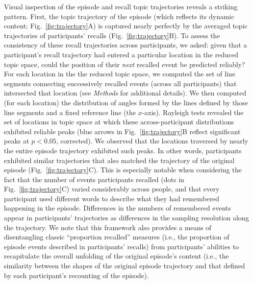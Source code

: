 \documentclass{article}
\begin{document}
Visual inspection of the episode and recall topic trajectories reveals a striking pattern.  First, the topic trajectory of the episode (which reflects its dynamic content; Fig.~\ref{fig:trajectory}A) is captured nearly perfectly by the averaged topic trajectories of participants' recalls (Fig.~\ref{fig:trajectory}B).  To assess the consistency of these recall trajectories across participants, we asked: given that a participant's recall trajectory had entered a particular location in the reduced topic space, could the position of their \textit{next} recalled event be predicted reliably?  For each location in the the reduced topic space, we computed the set of line segments connecting successively recalled events (across all participants) that intersected that location (see \textit{Methods} for additional details).  We then computed (for each location) the distribution of angles formed by the lines defined by those line segments and a fixed reference line (the $x$-axis).  Rayleigh tests revealed the set of locations in topic space at which these across-participant distributions exhibited reliable peaks (blue arrows in Fig.~\ref{fig:trajectory}B reflect significant peaks at $p < 0.05$, corrected).  We observed that the locations traversed by nearly the entire episode trajectory exhibited such peaks.  In other words, participants exhibited similar trajectories that also matched the trajectory of the original episode (Fig.~\ref{fig:trajectory}C).  This is especially notable when considering the fact that the number of events participants recalled (dots in Fig.~\ref{fig:trajectory}C) varied considerably across people, and that every participant used different words to describe what they had remembered happening in the episode.  Differences in the numbers of remembered events appear in participants' trajectories as differences in the sampling resolution along the trajectory.  We note that this framework also provides a means of disentangling classic ``proportion recalled'' measures (i.e., the proportion of episode events described in participants' recalls) from participants' abilities to recapitulate the overall unfolding of the original episode's content (i.e., the similarity between the shapes of the original episode trajectory and that defined by each participant's recounting of the episode).
\end{document}
